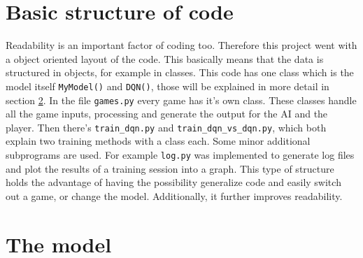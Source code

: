 \documentclass[12pt]{article}
\begin{document}
\section{Basic structure of code}
Readability is an important factor of coding too. Therefore this project went with a object oriented layout of the code. This basically means that the data is structured in objects, for example in classes. This code has one class which is the model itself \lstinline{MyModel()} and \lstinline{DQN()}, those will be explained in more detail in section \ref{sec:TheModel}. In the file \lstinline{games.py} every game has it's own class. These classes handle all the game \glspl{input}, processing and generate the \gls{output} for the \gls{AI} and the player. Then there's \lstinline{train_dqn.py} and \lstinline{train_dqn_vs_dqn.py}, which both explain two training methods with a class each. Some minor additional subprograms are used. For example \lstinline{log.py} was implemented to generate log files and plot the results of a training session into a graph. This type of structure holds the advantage of having the possibility generalize code and easily switch out a game, or change the model. Additionally, it further improves readability.

\section{The model}\label{sec:TheModel}
\end{document}

